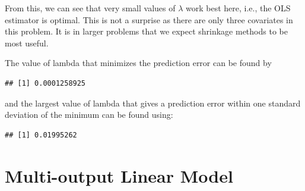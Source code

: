 \documentclass[
]{book}
\newenvironment{Shaded}{\begin{snugshade}}{\end{snugshade}}
\newcommand{\FloatTok}[1]{\textcolor[rgb]{0.00,0.00,0.81}{#1}}
\newcommand{\NormalTok}[1]{#1}
\newcommand{\SpecialCharTok}[1]{\textcolor[rgb]{0.81,0.36,0.00}{\textbf{#1}}}
\theoremstyle{definition}
\theoremstyle{definition}
\theoremstyle{definition}
\theoremstyle{definition}
\theoremstyle{remark}
\begin{document}
From this, we can see that very small values of \(\lambda\) work best here, i.e., the OLS estimator is optimal. This is not a surprise as there are only three covariates in this problem. It is in larger problems that we expect shrinkage methods to be most useful.

The value of lambda that minimizes the prediction error can be found by

\begin{Shaded}
\end{Shaded}

\begin{verbatim}
## [1] 0.0001258925
\end{verbatim}

and the largest value of lambda that gives a prediction error within one standard deviation of the minimum can be found using:

\begin{Shaded}
\end{Shaded}

\begin{verbatim}
## [1] 0.01995262
\end{verbatim}

\section{Multi-output Linear Model}\label{multi-output-linear-model}
\end{document}

